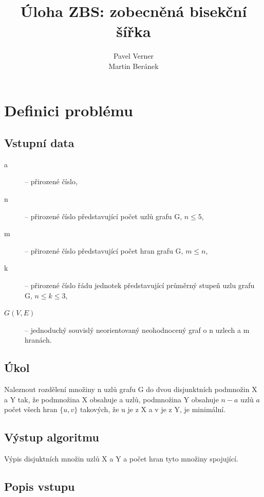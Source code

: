 \documentclass[a4paper,10pt]{report}
\begin{document}
\title{Úloha ZBS: zobecněná bisekční šířka}
\author{Pavel Verner \\ Martin Beránek}
\maketitle

\tableofcontents
\listoffigures
\listoftables
\newpage

\section{Definici problému}

\subsection{Vstupní data}

\begin{description}
	\item[a] -- přirozené číslo,
	\item[n] -- přirozené číslo představující počet uzlů grafu G, $n \leq 5$,
	\item[m] -- přirozené číslo představující počet hran grafu G, $m \leq n$,
	\item[k] -- přirozené číslo řádu jednotek představující průměrný stupeň uzlu grafu G, $n\leq k \leq3$,
	\item[$G(V,E)$] -- jednoduchý souvislý neorientovaný neohodnocený graf o n uzlech a m hranách.
\end{description}

\subsection{Úkol}

Naleznout rozdělení množiny n uzlů grafu G do dvou disjunktních podmnožin X a Y tak, že podmnožina X obsahuje a uzlů, podmnožina Y obsahuje $n-a$ uzlů $a$ počet všech hran $\{u,v\}$ takových, že u je z X a v je z Y, je minimální.

\subsection{Výstup algoritmu}

Výpis disjuktních množin uzlů X a Y a počet hran tyto množiny spojující.

\subsection{Popis vstupu}
\end{document}
